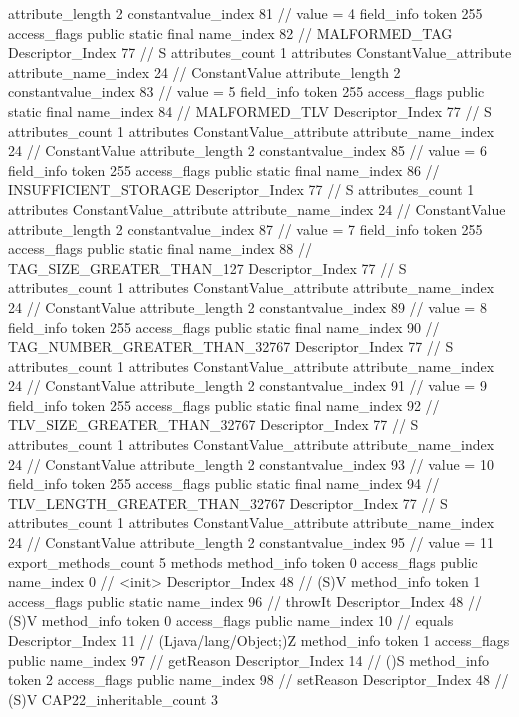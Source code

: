 {{{{{{{					attribute_length	2
					constantvalue_index	81		// value = 4
				}
				}
			}
			field_info {
				token	255
				access_flags	public static final
				name_index	82		// MALFORMED_TAG
				Descriptor_Index	77		// S
				attributes_count	1
				attributes {
				ConstantValue_attribute {
					attribute_name_index	24		// ConstantValue
					attribute_length	2
					constantvalue_index	83		// value = 5
				}
				}
			}
			field_info {
				token	255
				access_flags	public static final
				name_index	84		// MALFORMED_TLV
				Descriptor_Index	77		// S
				attributes_count	1
				attributes {
				ConstantValue_attribute {
					attribute_name_index	24		// ConstantValue
					attribute_length	2
					constantvalue_index	85		// value = 6
				}
				}
			}
			field_info {
				token	255
				access_flags	public static final
				name_index	86		// INSUFFICIENT_STORAGE
				Descriptor_Index	77		// S
				attributes_count	1
				attributes {
				ConstantValue_attribute {
					attribute_name_index	24		// ConstantValue
					attribute_length	2
					constantvalue_index	87		// value = 7
				}
				}
			}
			field_info {
				token	255
				access_flags	public static final
				name_index	88		// TAG_SIZE_GREATER_THAN_127
				Descriptor_Index	77		// S
				attributes_count	1
				attributes {
				ConstantValue_attribute {
					attribute_name_index	24		// ConstantValue
					attribute_length	2
					constantvalue_index	89		// value = 8
				}
				}
			}
			field_info {
				token	255
				access_flags	public static final
				name_index	90		// TAG_NUMBER_GREATER_THAN_32767
				Descriptor_Index	77		// S
				attributes_count	1
				attributes {
				ConstantValue_attribute {
					attribute_name_index	24		// ConstantValue
					attribute_length	2
					constantvalue_index	91		// value = 9
				}
				}
			}
			field_info {
				token	255
				access_flags	public static final
				name_index	92		// TLV_SIZE_GREATER_THAN_32767
				Descriptor_Index	77		// S
				attributes_count	1
				attributes {
				ConstantValue_attribute {
					attribute_name_index	24		// ConstantValue
					attribute_length	2
					constantvalue_index	93		// value = 10
				}
				}
			}
			field_info {
				token	255
				access_flags	public static final
				name_index	94		// TLV_LENGTH_GREATER_THAN_32767
				Descriptor_Index	77		// S
				attributes_count	1
				attributes {
				ConstantValue_attribute {
					attribute_name_index	24		// ConstantValue
					attribute_length	2
					constantvalue_index	95		// value = 11
				}
				}
			}
			}
			export_methods_count	5
			methods {
				method_info {
					token	0
					access_flags	public
					name_index	0		// <init>
					Descriptor_Index	48		// (S)V
				}
				method_info {
					token	1
					access_flags	public static
					name_index	96		// throwIt
					Descriptor_Index	48		// (S)V
				}
				method_info {
					token	0
					access_flags	public
					name_index	10		// equals
					Descriptor_Index	11		// (Ljava/lang/Object;)Z
				}
				method_info {
					token	1
					access_flags	public
					name_index	97		// getReason
					Descriptor_Index	14		// ()S
				}
				method_info {
					token	2
					access_flags	public
					name_index	98		// setReason
					Descriptor_Index	48		// (S)V
				}
			}
			CAP22_inheritable_count	3
		}
	}
}
